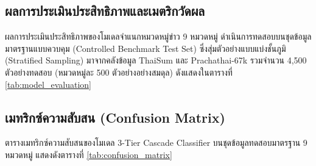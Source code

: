 \subsection{ผลการประเมินประสิทธิภาพและเมตริกวัดผล}

ผลการประเมินประสิทธิภาพของโมเดลจำแนกหมวดหมู่ข่าว 9 หมวดหมู่ ดำเนินการทดสอบบนชุดข้อมูลมาตรฐานแบบควบคุม (Controlled Benchmark Test Set) ซึ่งสุ่มตัวอย่างแบบแบ่งชั้นภูมิ (Stratified Sampling) มาจากคลังข้อมูล ThaiSum และ Prachathai-67k รวมจำนวน 4,500 ตัวอย่างทดสอบ (หมวดหมู่ละ 500 ตัวอย่างอย่างสมดุล) ดังแสดงในตารางที่ \ref{tab:model_evaluation}

\begin{table}[H]
\centering
\caption{เปรียบเทียบประสิทธิภาพของโมเดลจำแนกหมวดหมู่ข่าว 9 หมวดหมู่ บนชุดข้อมูลทดสอบมาตรฐาน (Benchmark Test Set)}
\label{tab:model_evaluation}
\end{table}

\subsection{เมทริกซ์ความสับสน (Confusion Matrix)}

ตารางเมทริกซ์ความสับสนของโมเดล 3-Tier Cascade Classifier บนชุดข้อมูลทดสอบมาตรฐาน 9 หมวดหมู่ แสดงดังตารางที่ \ref{tab:confusion_matrix}

